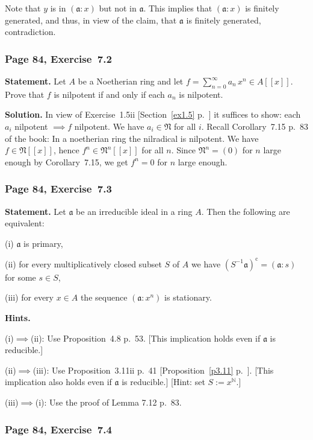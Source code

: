 \documentclass[12pt,letterpaper]{article}%
\newcommand{\oo}{\operatorname}\newcommand{\ooo}{\operatorname*}
\newcommand{\mf}{\mathfrak}
\newcommand{\aaa}{\mf a}
\newcommand{\NNN}{\mf N}\newcommand{\RRR}{\mf R}
\newcommand{\nn}{\noindent}
\begin{document}
Note that $y$ is in $(\aaa:x)$ but not in $\aaa$. This implies that $(\aaa:x)$ is finitely generated, and thus, in view of the claim, that $\aaa$ is finitely generated, contradiction.

\subsubsection{Page 84, Exercise~7.2}\label{ex7.2}%

\textbf{Statement.} Let $A$ be a Noetherian ring and let $f=\sum_{n=0}^\infty a_n\,x^n\in A[[x]]$. Prove that $f$ is nilpotent if and only if each $a_n$ is nilpotent.

\nn\textbf{Solution.} In view of Exercise~1.5ii [Section~\ref{ex1.5} p.~\pageref{ex1.5}] it suffices to show: each $a_i$ nilpotent $\implies f$ nilpotent. We have $a_i\in\NNN$ for all $i$. Recall Corollary~7.15 p.~83 of the book: In a noetherian ring the nilradical is nilpotent. We have $f\in\NNN[[x]]$, hence $f^n\in\NNN^n[[x]]$ for all $n$. Since $\NNN^n=(0)$ for $n$ large enough by Corollary~7.15, we get $f^n=0$ for $n$ large enough.%

\subsubsection{Page 84, Exercise~7.3}%

\textbf{Statement.} Let $\aaa$ be an irreducible ideal in a ring $A$. Then the following are equivalent: 

\nn(i) $\aaa$ is primary,

\nn(ii) for every multiplicatively closed subset $S$ of $A$ we have $(S^{-1}\aaa)^{\oo c}=(\aaa:s)$ for some $s\in S$,

\nn(iii) for every $x\in A$ the sequence $(\aaa:x^n)$ is stationary.

\nn\textbf{Hints.} 

\nn(i)$\implies$(ii): Use Proposition~4.8 p.~53. [This implication holds even if $\aaa$ is reducible.] 

\nn(ii)$\implies$(iii): Use Proposition~3.11ii p.~41 [Proposition~\ref{p3.11} p.~\pageref{p3.11}]. [This implication also holds even if $\aaa$ is reducible.] [Hint: set $S:=x^{\mathbb N}$.] 

\nn(iii)$\implies$(i): Use the proof of Lemma 7.12 p.~83.

\subsubsection{Page 84, Exercise~7.4}%
\end{document}
